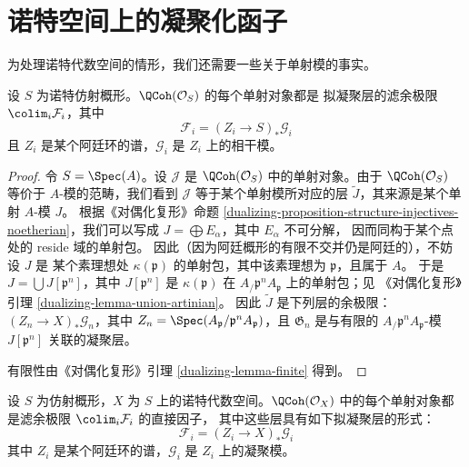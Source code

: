\section{诺特空间上的凝聚化函子}
\label{section-coherator-Noetherian}

\noindent
为处理诺特代数空间的情形，我们还需要一些关于单射模的事实。

\begin{lemma}
\label{lemma-affine-injective-colimit-direct-sum-pushforwards-artin}
设 $S$ 为诺特仿射概形。$\QCoh(\mathcal{O}_S)$ 的每个单射对象都是
拟凝聚层的滤余极限 $\colim_i \mathcal{F}_i$，其中
$$
\mathcal{F}_i = (Z_i \to S)_*\mathcal{G}_i
$$
且 $Z_i$ 是某个阿廷环的谱，$\mathcal{G}_i$ 是 $Z_i$ 上的相干模。
\end{lemma}

\begin{proof}
令 $S = \Spec(A)$。设 $\mathcal{J}$ 是
$\QCoh(\mathcal{O}_S)$ 中的单射对象。由于 $\QCoh(\mathcal{O}_S)$
等价于 $A$-模的范畴，我们看到 $\mathcal{J}$ 等于某个单射模所对应的层
$\widetilde{J}$，其来源是某个单射 $A$-模 $J$。
根据《对偶化复形》命题
\ref{dualizing-proposition-structure-injectives-noetherian}，我们可以写成
$J = \bigoplus E_\alpha$，其中 $E_\alpha$ 不可分解，
因而同构于某个点处的 reside 域的单射包。 %
因此（因为阿廷概形的有限不交并仍是阿廷的），不妨设 $J$ 是
某个素理想处 $\kappa(\mathfrak p)$ 的单射包，其中该素理想为
$\mathfrak p$，且属于 $A$。
于是 $J = \bigcup J[\mathfrak p^n]$，其中 $J[\mathfrak p^n]$ 是
$\kappa(\mathfrak p)$ 在 $A_\mathfrak/\mathfrak p^nA_\mathfrak p$ 上的单射包；见
《对偶化复形》引理 \ref{dualizing-lemma-union-artinian}。 %
因此 $\widetilde{J}$ 是下列层的余极限：
$(Z_n \to X)_*\mathcal{G}_n$，其中 %
$Z_n = \Spec(A_\mathfrak p/\mathfrak p^nA_\mathfrak p)$，且
$\mathfrak G_n$ 是与有限的
$A_\mathfrak/\mathfrak p^nA_\mathfrak p$-模 $J[\mathfrak p^n]$ 关联的凝聚层。
\par %
有限性由《对偶化复形》引理
\ref{dualizing-lemma-finite} 得到。
\end{proof}

\begin{lemma}
\label{lemma-injective-colimit-direct-sum-pushforwards-artin}
设 $S$ 为仿射概形，$X$ 为 $S$ 上的诺特代数空间。$\QCoh(\mathcal{O}_X)$
中的每个单射对象都是滤余极限 $\colim_i \mathcal{F}_i$ 的直接因子，
其中这些层具有如下拟凝聚层的形式：
$$
\mathcal{F}_i = (Z_i \to X)_*\mathcal{G}_i
$$
其中 $Z_i$ 是某个阿廷环的谱，$\mathcal{G}_i$ 是 $Z_i$ 上的凝聚模。
\end{lemma}

